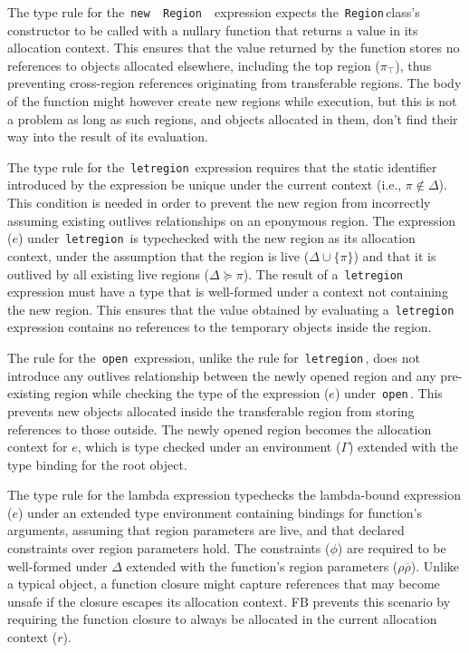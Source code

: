 \documentclass[a4paper,UKenglish]{lipics-v2018}
\newcommand{\C}[1]{\code{#1}}
\newcommand{\code}[1]{\,{\tt #1}\,}
\newcommand{\env}[0]{\Gamma}
\newcommand{\FB}{{\sc FB}\xspace}
\newcommand{\outlives}{\succeq}
\newcommand{\RgnZ}{\C{Region}}
\newcommand{\rhobar}{\bar{\rho}}
\newcommand{\rgn}{r}
\renewcommand{\bar}[1]{\overline{#1}}
\newcommand{\toprgn}{\pi_{\top}}
\begin{document}
The type rule for the \C{new \RgnZ} expression expects the \RgnZ class's
constructor to be called with a nullary function that returns a value
in its allocation context.  This ensures that the value returned by
the function stores no references to objects allocated elsewhere,
including the top region ($\toprgn$), thus preventing cross-region
references originating from transferable regions. The body of the
function might however create new regions while execution, but this is
not a problem as long as such regions, and objects allocated in them,
don't find their way into the result of its evaluation.

The type rule for the \C{letregion} expression requires that the static
identifier introduced by the expression be unique under the current
context (i.e., $\pi \notin \Delta$). This condition is needed in order
to prevent the new region from incorrectly assuming existing outlives
relationships on an eponymous region. The expression ($e$) under
\C{letregion} is typechecked with the new region as its allocation
context, under the assumption that the region is live ($\Delta \cup
\{\pi\}$) and that it is outlived by all existing live regions
($\Delta \outlives \pi$). The result of a \C{letregion} expression
must have a type that is well-formed under a context not containing
the new region. This ensures that the value obtained by evaluating a
\C{letregion} expression contains no references to the temporary
objects inside the region.

The rule for the \C{open} expression, unlike the rule for
\C{letregion}, does not introduce any outlives relationship between
the newly opened region and any pre-existing region while checking the
type of the expression ($e$) under \C{open}. This prevents new objects
allocated inside the transferable region from storing references to
those outside. The newly opened region becomes the allocation context
for $e$, which is type checked under an environment ($\env$) extended
with the type binding for the root object.

The type rule for the lambda expression typechecks the lambda-bound
expression ($e$) under an extended type environment containing
bindings for function's arguments, assuming that region parameters are
live, and that declared constraints over region parameters hold. The
constraints ($\phi$) are required to be well-formed under $\Delta$
extended with the function's region parameters ($\rho\rhobar$).
Unlike a typical object, a function closure might capture references
that may become unsafe if the closure escapes its allocation context.
\FB prevents this scenario by requiring the function closure to always
be allocated in the current allocation context ($\rgn$). 
\end{document}
